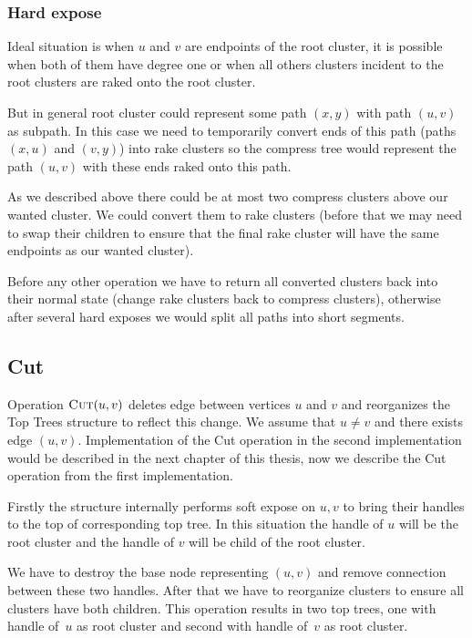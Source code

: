 \subsubsection{Hard expose}

Ideal situation is when $u$ and $v$ are endpoints of the root cluster, it is
possible when both of them have degree one or when all others clusters incident
to the root clusters are raked onto the root cluster.

But in general root cluster could represent some path $(x,y)$ with path $(u,v)$
as subpath. In this case we need to temporarily convert ends of this path (paths
$(x,u)$ and $(v,y)$) into rake clusters so the compress tree would represent the
path $(u,v)$ with these ends raked onto this path.

As we described above there could be at most two compress clusters above our
wanted cluster. We could convert them to rake clusters (before that we may need
to swap their children to ensure that the final rake cluster will have the same
endpoints as our wanted cluster).

Before any other operation we have to return all converted clusters back into
their normal state (change rake clusters back to compress clusters), otherwise
after several hard exposes we would split all paths into short segments.


\subsection{Cut}

Operation $\hbox{\sc Cut}(u,v)$ deletes edge between vertices $u$ and $v$ and reorganizes
the Top Trees structure to reflect this change. We assume that $u\ne v$ and
there exists edge $(u,v)$. Implementation of the Cut operation in the second
implementation would be described in the next chapter of this thesis, now we
describe the Cut operation from the first implementation.

Firstly the structure internally performs {\I soft expose} on $u,v$ to bring
their handles to the top of corresponding top tree. In this situation the
handle of $u$ will be the root cluster and the handle of $v$ will be child of
the root cluster.

We have to destroy the base node representing $(u,v)$ and remove connection
between these two handles. After that we have to reorganize clusters to ensure
all clusters have both children. This operation results in two top trees, one
with handle of~$u$ as root cluster and second with handle of~$v$ as root
cluster.

